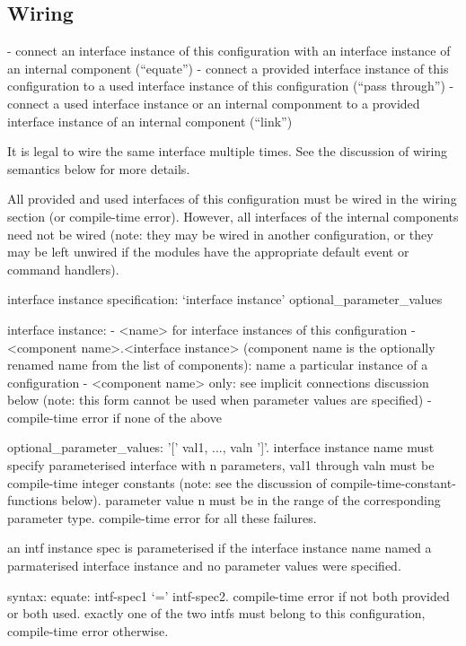 \documentclass[11pt]{article}
\begin{document}
\subsection{Wiring}

- connect an interface instance of this configuration with an interface
instance of an internal component (``equate'')
- connect a provided interface instance of this configuration to a used
interface instance of this configuration (``pass through'')
- connect a used interface instance or an internal componment to a provided
interface instance of an internal component (``link'')

It is legal to wire the same interface multiple times. See the discussion
of wiring semantics below for more details.

All provided and used interfaces of this configuration must be wired in the
wiring section (or compile-time error). However, all interfaces of the
internal components need not be wired (note: they may be wired in another
configuration, or they may be left unwired if the modules have the
appropriate default event or command handlers).

interface instance specification: `interface instance'  optional_parameter_values

interface instance:
- <name> for interface instances of this configuration
- <component name>.<interface instance> (component name is the
optionally renamed name from the list of components): name a particular
instance of a configuration
- <component name> only: see implicit connections discussion below (note:
this form cannot be used when parameter values are specified)
- compile-time error if none of the above

optional_parameter_values: '[' val1, ..., valn ']'. interface instance name
must specify parameterised interface with n parameters, val1 through valn
must be compile-time integer constants (note: see the discussion of
compile-time-constant-functions below). parameter value n must be in the
range of the corresponding parameter type. compile-time error for all
these failures.

an intf instance spec is parameterised if the interface instance name
named a parmaterised interface instance and no parameter values were
specified.

syntax:
equate: intf-spec1 `=' intf-spec2. compile-time error if not both 
provided or both used. exactly one of the two intfs must belong
to this configuration, compile-time error otherwise. 
\end{document}
